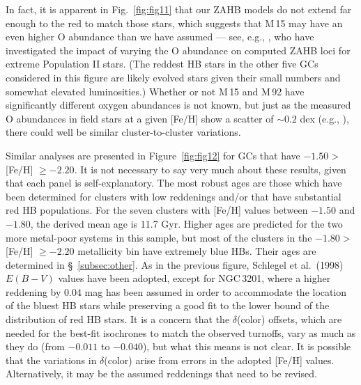 \documentclass[12pt,preprint]{aastex}
\begin{document}
In fact, it is apparent in Fig.~\ref{fig:fig11} that our ZAHB models do not
extend far enough to the red to match those stars, which suggests that M$\,$15
may have an even higher O abundance than we have assumed --- see, e.g., 
\citealt{vb01}, who have investigated the impact of varying the O abundance on
computed ZAHB loci for extreme Population II stars.  (The reddest HB stars in
the other five GCs considered in this figure are likely evolved stars given
their small numbers and somewhat elevated luminosities.)  Whether or not M$\,$15
and M$\,$92 have significantly different oxygen abundances is not known, but
just as the measured O abundances in field stars at a given [Fe/H] show a
scatter of $\sim 0.2$ dex (e.g., \citealt{fna09}), there could well be similar 
cluster-to-cluster variations.  

Similar analyses are presented in Figure~\ref{fig:fig12} for GCs that have
$-1.50 >$ [Fe/H] $\ge -2.20$.  It is not necessary to say very much about these
results, given that each panel is self-explanatory.  The most robust ages are
those which have been determined for clusters with low reddenings and/or that
have substantial red HB populations.  For the seven clusters with [Fe/H] values
between $-1.50$ and $-1.80$, the derived mean age is 11.7 Gyr.  Higher ages are
predicted for the two more metal-poor systems in this sample, but most of the
clusters in the $-1.80 >$ [Fe/H] $\ge -2.20$ metallicity bin have extremely blue
HBs.  Their ages are determined in \S~\ref{subsec:other}.  As in
the previous figure, Schlegel et al.~(1998) $E(B-V)$ values have been adopted,
except for NGC$\,$3201, where a higher reddening by 0.04 mag has been assumed
in order to accommodate the location of the bluest HB stars while preserving a
good fit to the lower bound of the distribution of red HB stars.  It is a
concern that the $\delta$(color) offsets, which are needed for the best-fit
isochrones to match the observed turnoffs, vary as much as they do (from
$-0.011$ to $-0.040$), but what this means is not clear.  It is possible that 
the variations in $\delta$(color) arise from errors in the adopted [Fe/H]
values.  Alternatively, it may be the assumed reddenings that need to be
revised.
\end{document}
